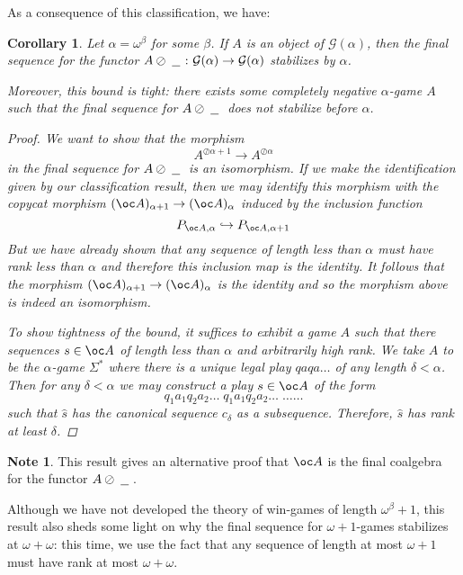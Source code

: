 \documentclass[11pt]{article} %
\theoremstyle{plain} %
\newtheorem{corollary}[theorem]{Corollary}
\theoremstyle{definition} %
\theoremstyle{note}
\newtheorem{note}[theorem]{Note}
\theoremstyle{exercisestyle}
\newcommand*\from{\colon}
\newcommand{\sequoid}{\oslash}
\newcommand{\G}{\mathcal G}
\newcommand{\st}{{\Sigma^*}}
\newcommand{\blank}{\;\underline{\hspace{1.5ex}}\;}
\begin{document}
As a consequence of this classification, we have:

\begin{corollary}
  Let $\alpha=\omega^\beta$ for some $\beta$.  If $A$ is an object of $\G(\alpha)$, then the final sequence for the functor $A\sequoid\blank\from\G(\alpha)\to\G(\alpha)$ stabilizes by $\alpha$.  

  Moreover, this bound is tight: there exists some completely negative $\alpha$-game $A$ such that the final sequence for $A\sequoid\blank$ does not stabilize before $\alpha$.  
  \begin{proof}
    We want to show that the morphism
    \[
      A^{\sequoid\alpha+1}\to A^{\sequoid\alpha}
      \]
    in the final sequence for $A\sequoid\blank$ is an isomorphism.  If we make the identification given by our classification result, then we may identify this morphism with the copycat morphism $(\oc A)_{\alpha+1}\to(\oc A)_\alpha$ induced by the inclusion function
    \[
      P_{\oc A,\alpha}\hookrightarrow P_{\oc A,\alpha+1}
      \]
    But we have already shown that any sequence of length less than $\alpha$ must have rank less than $\alpha$ and therefore this inclusion map is the identity.  It follows that the morphism $(\oc A)_{\alpha+1}\to(\oc A)_\alpha$ is the identity and so the morphism above is indeed an isomorphism.

    To show tightness of the bound, it suffices to exhibit a game $A$ such that there sequences $s\in\oc A$ of length less than $\alpha$ and arbitrarily high rank.  We take $A$ to be the $\alpha$-game $\st$ where there is a unique legal play $qaqa\dots$ of any length $\delta<\alpha$.  Then for any $\delta<\alpha$ we may construct a play $s\in\oc A$ of the form
    \[
      q_1a_1q_2a_2\dots\;q_1a_1q_2a_2\dots\;\dots\dots
      \]
    such that $\hat{s}$ has the canonical sequence $c_{\delta}$ as a subsequence.  Therefore, $\hat{s}$ has rank at least $\delta$.  
  \end{proof}
\end{corollary}

\begin{note}
  This result gives an alternative proof that $\oc A$ is the final coalgebra for the functor $A\sequoid\blank$.  

  Although we have not developed the theory of win-games of length $\omega^\beta+1$, this result also sheds some light on why the final sequence for $\omega+1$-games stabilizes at $\omega+\omega$: this time, we use the fact that any sequence of length at most $\omega+1$ must have rank at most $\omega+\omega$.  
\end{note}
\end{document}
